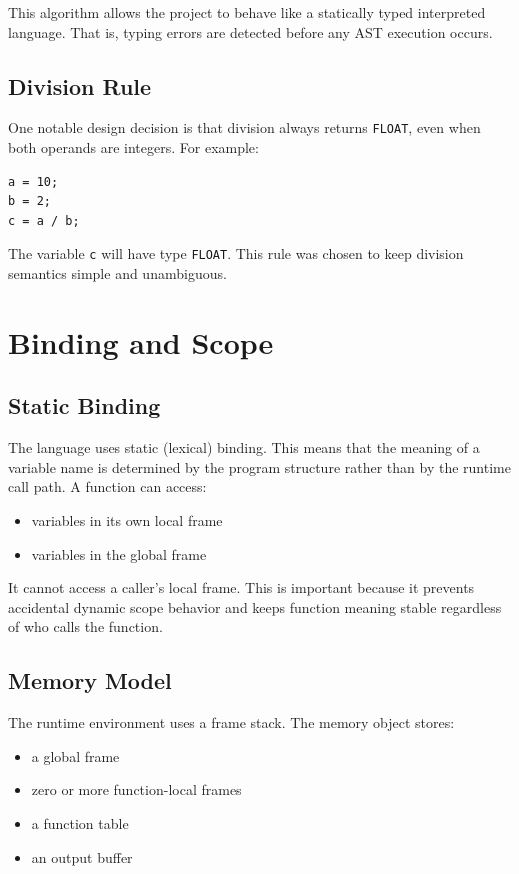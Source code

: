 \documentclass[12pt,a4paper]{article}
\begin{document}
This algorithm allows the project to behave like a statically typed interpreted language. That is, typing errors are detected before any AST execution occurs.

\subsection{Division Rule}
One notable design decision is that division always returns \texttt{FLOAT}, even when both operands are integers. For example:

\begin{lstlisting}
a = 10;
b = 2;
c = a / b;
\end{lstlisting}

The variable \texttt{c} will have type \texttt{FLOAT}. This rule was chosen to keep division semantics simple and unambiguous.

\section{Binding and Scope}
\subsection{Static Binding}
The language uses static (lexical) binding. This means that the meaning of a variable name is determined by the program structure rather than by the runtime call path. A function can access:

\begin{itemize}[leftmargin=1.0cm]
    \item variables in its own local frame
    \item variables in the global frame
\end{itemize}

It cannot access a caller's local frame. This is important because it prevents accidental dynamic scope behavior and keeps function meaning stable regardless of who calls the function.

\subsection{Memory Model}
The runtime environment uses a frame stack. The memory object stores:

\begin{itemize}[leftmargin=1.0cm]
    \item a global frame
    \item zero or more function-local frames
    \item a function table
    \item an output buffer
\end{itemize}
\end{document}
